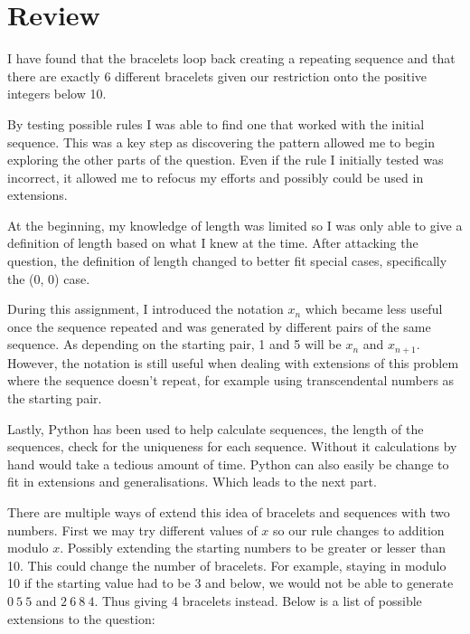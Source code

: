 \documentclass[11pt]{article}
\newcommand{\keywordfont}{\textsc}
\newcommand{\keyword}[1]{%
  \marginpar{\raggedright\small\keywordfont{#1}}}
\begin{document}



\section{Review}

I have found \keyword{Check}  that the bracelets loop back creating a repeating sequence and that there are exactly 6 different bracelets given our restriction onto the positive integers below 10. 

By testing possible rules \keyword{Reflect} I was able to find one that worked with the initial sequence. This was a key step as discovering the pattern allowed me to begin exploring the other parts of the question. Even if the rule I initially tested was incorrect, it allowed me to refocus my efforts and possibly could be used in extensions.

At the beginning, my knowledge of length was limited so I was only able to give a definition of length based on what I knew at the time. After attacking the question, the definition of length changed to better fit special cases, specifically the (0, 0) case. 

During this assignment, I introduced the notation $x_n$ which became less useful once the sequence repeated and was generated by different pairs of the same sequence. As depending on the starting pair, 1 and 5 will be $x_n$ and $x_{n+1}$. However, the notation is still useful when dealing with extensions of this problem where the sequence doesn't repeat, for example using transcendental numbers as the starting pair.

Lastly, Python has been used to help calculate sequences, the length of the sequences, check for the uniqueness for each sequence. Without it calculations by hand would take a tedious amount of time. Python can also easily be change to fit in extensions and generalisations. Which leads to the next part.

There are multiple ways of extend this idea of bracelets and sequences with two numbers. \keyword{Extend} First we may try different values of $x$ so our rule changes to addition modulo $x$. Possibly extending the starting numbers to be greater or lesser than 10. This could change the number of bracelets. For example, staying in modulo 10 if the starting value had to be 3 and below, we would not be able to generate $0 \ 5 \ 5$ and $ 2 \ 6 \ 8 \ 4$. Thus giving 4 bracelets instead. Below is a list of possible extensions to the question:
\end{document}
